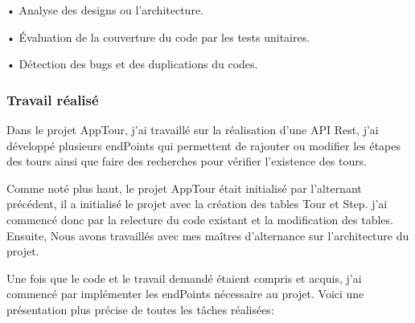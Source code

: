 \documentclass[12pt]{article}
\begin{document}
• Analyse des designs ou l’architecture.

• Évaluation de la couverture du code par les tests unitaires.

• Détection des bugs et des duplications du codes.
 
\subsubsection{Travail réalisé}

Dans le projet AppTour, j'ai travaillé sur la réalisation d'une API Rest, j'ai développé plusieurs endPoints qui permettent de rajouter ou modifier les étapes des tours ainsi que faire des recherches pour vérifier l’existence des tours. 

Comme noté plus haut, le projet AppTour était initialisé par l'alternant précédent, il a initialisé le projet avec la création des tables Tour et Step. j'ai commencé donc par la relecture du code existant et la modification des tables. Ensuite, Nous avons travaillés avec mes maîtres d'alternance sur l'architecture du projet.

Une fois que le code et le travail demandé étaient compris et acquis, j'ai commencé par implémenter les endPoints nécessaire au projet. Voici une présentation plus précise de toutes les tâches réalisées:   
\end{document}
